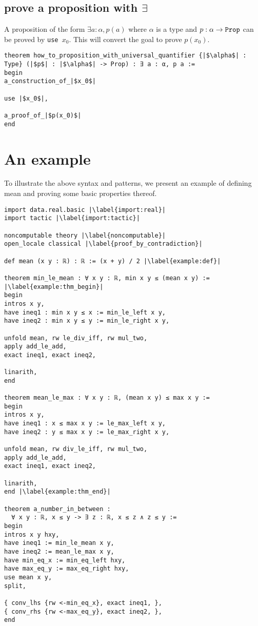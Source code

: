 \documentclass{report}
\theoremstyle{definition}
\theoremstyle{plain}
\begin{document}
\subsection{prove a proposition with $\exists$}\label{lean:exists}
A proposition of the form $\exists a:\alpha, p(a)$ where $\alpha$ is a type and $p : \alpha\to {\tt \small Prop}$ can be proved by {\tt \small use $x_0$}. This will convert the goal to prove $p(x_0)$.

\begin{verbatim}
theorem how_to_proposition_with_universal_quantifier {|$\alpha$| : Type} (|$p$| : |$\alpha$| -> Prop) : ∃ a : α, p a :=
begin
a_construction_of_|$x_0$|

use |$x_0$|,
  
a_proof_of_|$p(x_0)$|
end
\end{verbatim}

\section{An example}
To illustrate the above syntax and patterns, we present an example of defining mean and proving some basic properties thereof.

\begin{verbatim}
import data.real.basic |\label{import:real}|
import tactic |\label{import:tactic}|
  
noncomputable theory |\label{noncomputable}|
open_locale classical |\label{proof_by_contradiction}|  

def mean (x y : ℝ) : ℝ := (x + y) / 2 |\label{example:def}|
  
theorem min_le_mean : ∀ x y : ℝ, min x y ≤ (mean x y) := |\label{example:thm_begin}|
begin
intros x y,
have ineq1 : min x y ≤ x := min_le_left x y,
have ineq2 : min x y ≤ y := min_le_right x y,
    
unfold mean, rw le_div_iff, rw mul_two, 
apply add_le_add, 
exact ineq1, exact ineq2, 
  
linarith,
end
  
theorem mean_le_max : ∀ x y : ℝ, (mean x y) ≤ max x y :=
begin
intros x y,
have ineq1 : x ≤ max x y := le_max_left x y,
have ineq2 : y ≤ max x y := le_max_right x y,
  
unfold mean, rw div_le_iff, rw mul_two,
apply add_le_add,
exact ineq1, exact ineq2,
  
linarith,
end |\label{example:thm_end}|
  
theorem a_number_in_between : 
  ∀ x y : ℝ, x ≤ y -> ∃ z : ℝ, x ≤ z ∧ z ≤ y :=
begin
intros x y hxy,
have ineq1 := min_le_mean x y,
have ineq2 := mean_le_max x y,
have min_eq_x := min_eq_left hxy,
have max_eq_y := max_eq_right hxy,
use mean x y,
split,
  
{ conv_lhs {rw <-min_eq_x}, exact ineq1, },
{ conv_rhs {rw <-max_eq_y}, exact ineq2, },
end

\end{verbatim}
\end{document}
